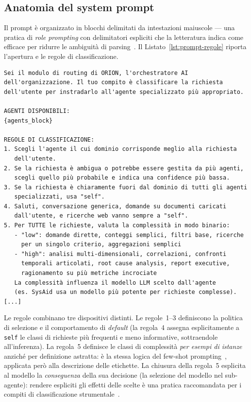 \subsection{Anatomia del system prompt}
\label{subsec:eval-prompt-anatomia}

Il prompt è organizzato in blocchi delimitati da intestazioni maiuscole
--- una pratica di \emph{role prompting} con delimitatori espliciti che la
letteratura indica come efficace per ridurre le ambiguità di
parsing~\cite{sahoo2024prompteng_survey}. Il Listato~\ref{lst:prompt-regole}
riporta l'apertura e le regole di classificazione.

\begin{lstlisting}[caption={Estratto del system prompt del router (v1.0): ruolo, blocco agenti e regole di classificazione. Il segno [...] indica omissioni; i segnaposto fra graffe sono compilati a runtime.},label={lst:prompt-regole}]
Sei il modulo di routing di ORION, l'orchestratore AI
dell'organizzazione. Il tuo compito è classificare la richiesta
dell'utente per instradarlo all'agente specializzato più appropriato.

AGENTI DISPONIBILI:
{agents_block}

REGOLE DI CLASSIFICAZIONE:
1. Scegli l'agente il cui dominio corrisponde meglio alla richiesta
   dell'utente.
2. Se la richiesta è ambigua o potrebbe essere gestita da più agenti,
   scegli quello più probabile e indica una confidence più bassa.
3. Se la richiesta è chiaramente fuori dal dominio di tutti gli agenti
   specializzati, usa "self".
4. Saluti, conversazione generica, domande su documenti caricati
   dall'utente, e ricerche web vanno sempre a "self".
5. Per TUTTE le richieste, valuta la complessità in modo binario:
   - "low": domande dirette, conteggi semplici, filtri base, ricerche
     per un singolo criterio, aggregazioni semplici
   - "high": analisi multi-dimensionali, correlazioni, confronti
     temporali articolati, root cause analysis, report executive,
     ragionamento su più metriche incrociate
   La complessità influenza il modello LLM scelto dall'agente
   (es. SysAid usa un modello più potente per richieste complesse).
[...]
\end{lstlisting}

Le regole combinano tre dispositivi distinti. Le regole~1--3 definiscono la
politica di selezione e il comportamento di \emph{default} (la regola~4
assegna esplicitamente a \texttt{self} le classi di richieste più frequenti
e meno informative, sottraendole all'inferenza). La regola~5 definisce le
classi di complessità \emph{per esempi di istanze} anziché per definizione
astratta: è la stessa logica del few-shot
prompting~\cite{brown2020gpt3}, applicata però alla descrizione delle
etichette. La chiusura della regola~5 esplicita al modello la
\emph{conseguenza} della sua decisione (la selezione del modello nel
sub-agente): rendere espliciti gli effetti delle scelte è una pratica
raccomandata per i compiti di classificazione
strumentale~\cite{sahoo2024prompteng_survey}.


